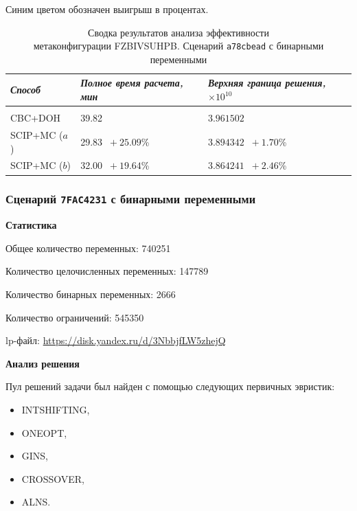 \documentclass[%
	11pt,
	a4paper,
	utf8,
		]{article}
\begin{document}
Синим цветом обозначен выигрыш в процентах.

{
\begin{table}[!h]
	\centering
	\caption{Сводка результатов анализа эффективности\\метаконфигурации FZBIVSUHPB. Сценарий \texttt{a78cbead} с бинарными переменными}
	\begin{tabular}{ p{2.5cm} p{3.3cm} p{3.4cm} }
		\emph{Способ} & \emph{Полное время расчета, мин} & \emph{Верхняя граница решения, $ \times 10^{10} $} \\
		\hline\hline\\[-3.5mm]
		{CBC+DOH} & 39.82 & $ 3.961502 $ \\
		\hline
		SCIP+MC ($ a $) & 29.83 {\color{blue} $\ +25.09 $\%} & $ 3.894342 $ {\color{blue} $\ +1.70 $\%} \\
		\hline
		SCIP+MC ($ b $) & 32.00 {\color{blue} $\ +19.64 $\%} & $ 3.864241 $ {\color{blue} $\ +2.46 $\%} \\
	\end{tabular}\label{tab:a78cbead}
\end{table}
}

\subsubsection{Сценарий \texttt{7FAC4231} с бинарными переменными}

\textbf{Статистика}\vspace*{1mm}

Общее количество переменных: 740251

Количество целочисленных переменных: 147789

Количество бинарных переменных: 2666

Количество ограничений: 545350

lp-файл: \url{https://disk.yandex.ru/d/3NbbjfLW5zhejQ}

\vspace*{5mm}\textbf{Анализ решения}\vspace*{1mm}

Пул решений задачи был найден с помощью следующих первичных эвристик:
\begin{itemize}
	\item INTSHIFTING,
	
	\item ONEOPT,
	
	\item GINS,
	
	\item CROSSOVER,
	
	\item ALNS.
\end{itemize}
\end{document}

